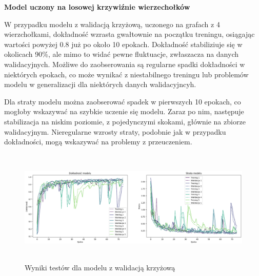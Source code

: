 


\textbf{Model uczony na losowej krzywiźnie wierzechołków}

W przypadku modelu z walidacją krzyżową, uczonego na grafach z 4 wierzchołkami,
dokładność wzrasta gwałtownie na początku treningu,
osiągając wartości powyżej 0.8 już po około 10 epokach.
Dokładność stabiliziuje się w okolicach 90\%, ale mimo to widać pewne fluktuacje, zwłaszacza na danych walidacyjnych.
Możliwe do zaobserowania są regularne spadki dokładności w niektórych epokach,
co może wynikać z niestabilnego treningu lub problemów modelu w generalizacji dla niektórych danych walidacyjncyh.

Dla straty modelu można zaobserować spadek w pierwszych 10 epokach, co mogłoby wskazywać na szybkie uczenie się modelu.
Zaraz po nim, następuje stabilizacja na niskim poziomie, z pojedynczymi skokami, głównie na zbiorze walidacyjnym.
Nieregularne wzrosty straty, podobnie jak w przypadku dokładności, mogą wskazywać na problemy z przeuczeniem.

\begin{figure}[ht]
	\centering
	\includegraphics[height=5.5cm]{resources/tests/images/v3/crossvalid_img.png}
	\caption{Wyniki testów dla modelu z walidacją krzyżową}
	\label{Fig:tests-cv-0a}
\end{figure}
\FloatBarrier

